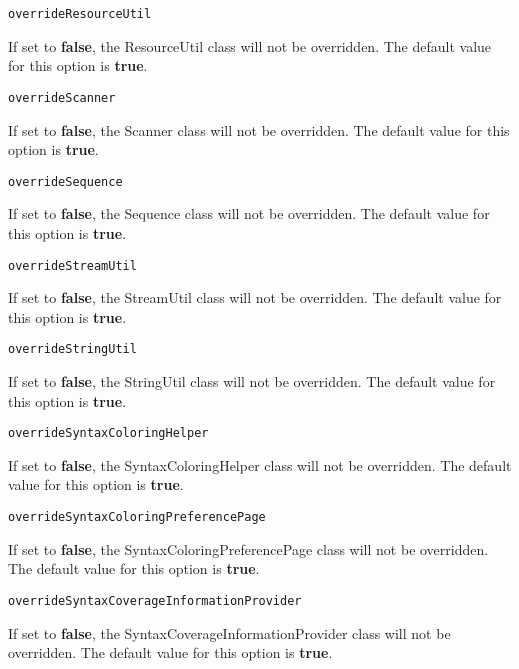 \noindent\texttt{overrideResourceUtil}
\begin{myindentpar}{1cm}
If set to \textbf{false}, the ResourceUtil class will not be overridden. The default value for this option is \textbf{true}.
\end{myindentpar}

\noindent\texttt{overrideScanner}
\begin{myindentpar}{1cm}
If set to \textbf{false}, the Scanner class will not be overridden. The default value for this option is \textbf{true}.
\end{myindentpar}

\noindent\texttt{overrideSequence}
\begin{myindentpar}{1cm}
If set to \textbf{false}, the Sequence class will not be overridden. The default value for this option is \textbf{true}.
\end{myindentpar}

\noindent\texttt{overrideStreamUtil}
\begin{myindentpar}{1cm}
If set to \textbf{false}, the StreamUtil class will not be overridden. The default value for this option is \textbf{true}.
\end{myindentpar}

\noindent\texttt{overrideStringUtil}
\begin{myindentpar}{1cm}
If set to \textbf{false}, the StringUtil class will not be overridden. The default value for this option is \textbf{true}.
\end{myindentpar}

\noindent\texttt{overrideSyntaxColoringHelper}
\begin{myindentpar}{1cm}
If set to \textbf{false}, the SyntaxColoringHelper class will not be overridden. The default value for this option is \textbf{true}.
\end{myindentpar}

\noindent\texttt{overrideSyntaxColoringPreferencePage}
\begin{myindentpar}{1cm}
If set to \textbf{false}, the SyntaxColoringPreferencePage class will not be overridden. The default value for this option is \textbf{true}.
\end{myindentpar}

\noindent\texttt{overrideSyntaxCoverageInformationProvider}
\begin{myindentpar}{1cm}
If set to \textbf{false}, the SyntaxCoverageInformationProvider class will not be overridden. The default value for this option is \textbf{true}.
\end{myindentpar}

